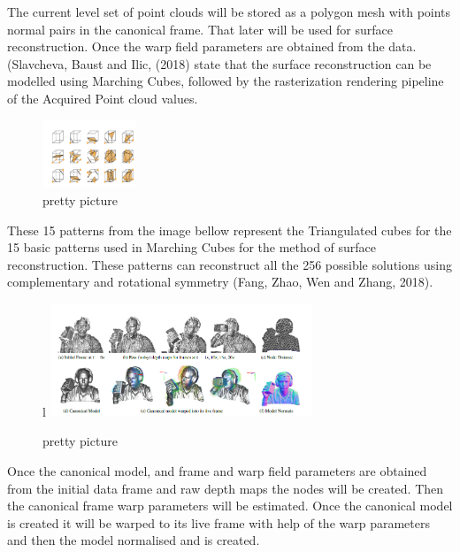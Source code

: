 \documentclass[a4paper]{article}
\begin{document}
The current level set of point clouds will be stored as a polygon mesh with points normal pairs in the canonical frame. That later will be used for surface reconstruction.   
Once the warp field parameters are obtained from the data.(Slavcheva, Baust and Ilic, (2018) state that  the surface reconstruction can be modelled using Marching Cubes, followed by the rasterization rendering pipeline of the Acquired Point cloud values.\\
\begin{figure} %
    \centering
    \includegraphics[width=0.25\textwidth]{shapes.png}
    \caption{pretty picture}
\end{figure}
These 15 patterns from the image bellow represent the Triangulated cubes for the 15 basic patterns used in Marching Cubes for the method of surface reconstruction. These patterns can reconstruct all the 256 possible solutions using complementary and rotational symmetry (Fang, Zhao, Wen and Zhang, 2018).
\begin{figure}{l} %
    \centering
    \includegraphics[width=0.7\textwidth]{dynamicfusion2.png}
    \caption{pretty picture}
\end{figure}
Once the canonical model, and frame and warp field parameters are obtained from the initial data frame and raw depth maps the nodes will be created. Then the canonical frame warp parameters will be estimated. Once the canonical model is created it will be warped to its live frame with help of the warp parameters and then the model normalised and is created. \\
\enlargethispage{\baselineskip}
\end{document}
